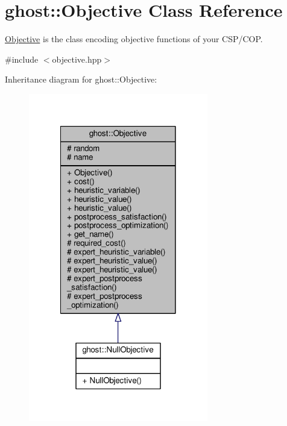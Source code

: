 \hypertarget{classghost_1_1Objective}{\section{ghost\-:\-:Objective Class Reference}
\label{classghost_1_1Objective}
}


\hyperlink{classghost_1_1Objective}{Objective} is the class encoding objective functions of your C\-S\-P/\-C\-O\-P.  




{\ttfamily \#include $<$objective.\-hpp$>$}



Inheritance diagram for ghost\-:\-:Objective\-:
\nopagebreak
\begin{figure}[H]
\begin{center}
\leavevmode
\includegraphics[width=222pt]{classghost_1_1Objective__inherit__graph}
\end{center}
\end{figure}


